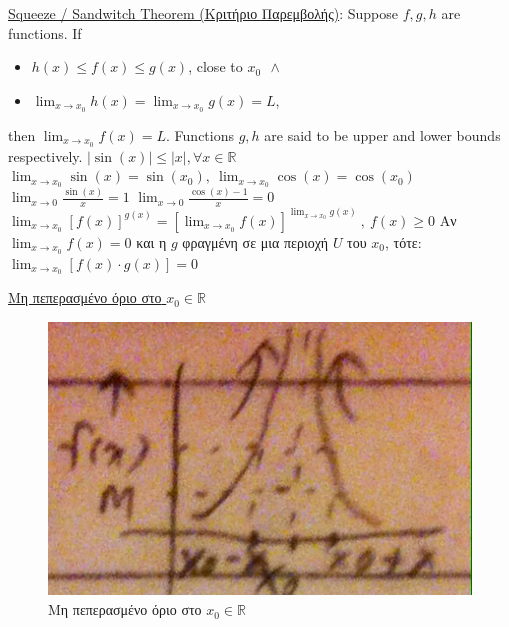 \documentclass[12pt]{article}
\begin{document}
\begin{flushleft}
	\textbullet \quad \uline{Squeeze / Sandwitch Theorem (\textgreek{Κριτήριο Παρεμβολής})}: \linebreak 
	Suppose $f,g,h$ are functions. If  
	\begin{itemize}
		\renewcommand{\labelitemi}{$\rightarrow$}
	\item $\displaystyle h(x) \leq f(x) \leq g(x)$, close to $x_0 \ \ \land $
	\item $\displaystyle \lim_{x\to x_0} h(x) = \lim_{x\to x_0} g(x) = L$, 
	\end{itemize}
	then $\displaystyle \lim_{x\to x_0} f(x) = L$. \linebreak 
	Functions $g,h$ are said to be upper and lower bounds respectively. \linebreak 
	\textbullet \quad $\displaystyle |\sin (x)| \leq |x|, \forall x\in \mathbb{R}$ \linebreak 
	\textbullet \quad $\displaystyle \lim_{x\to x_0} \sin (x) = \sin (x_0),\ \lim_{x\to x_0} \cos (x) = \cos (x_0)$ \linebreak 
	\textbullet \quad $\displaystyle \lim_{x\to 0} \frac{\sin (x)}{x} = 1$ \linebreak 
	\textbullet \quad $\displaystyle \lim_{x\to 0} \frac{\cos (x) - 1}{x} = 0 $ \linebreak 
	\textbullet \quad $\displaystyle \lim_{x\to x_0} \left[f(x)\right]^{g(x)} = \left[ \lim_{x\to x_0} f(x) \right]^{\lim_{x\to x_0} g(x)}\ , \ f(x) \geq 0$ \linebreak 
	\textbullet \quad \textgreek{Αν} $\displaystyle \lim_{x\to x_0} f(x) = 0 $ \textgreek{και η} $g$ \textgreek{φραγμένη σε μια περιοχή} $U$ \textgreek{του} $x_0$, \textgreek{τότε}: $\displaystyle \lim_{x\to x_0} \left[ f(x) \cdot g(x) \right] = 0$ \linebreak 
	
	\textbullet \quad \uline{\textgreek{Μη πεπερασμένο όριο στο} $x_0 \in \mathbb{R}$} \linebreak 

	\begin{figure}[H]
	\centering
	\includegraphics[scale=0.4]{infiniteLimitxo}
	\caption{\textgreek{Μη πεπερασμένο όριο στο} $x_0 \in \mathbb{R}$}
	\label{fig:infiniteLimitxo}
	\end{figure}
	

\end{flushleft}
\end{document}
